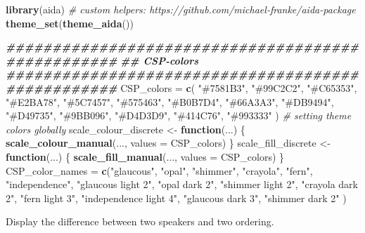 \documentclass[
]{article}
\newenvironment{Shaded}{\begin{snugshade}}{\end{snugshade}}
\newcommand{\AttributeTok}[1]{\textcolor[rgb]{0.13,0.29,0.53}{#1}}
\newcommand{\CommentTok}[1]{\textcolor[rgb]{0.56,0.35,0.01}{\textit{#1}}}
\newcommand{\ControlFlowTok}[1]{\textcolor[rgb]{0.13,0.29,0.53}{\textbf{#1}}}
\newcommand{\DocumentationTok}[1]{\textcolor[rgb]{0.56,0.35,0.01}{\textbf{\textit{#1}}}}
\newcommand{\FunctionTok}[1]{\textcolor[rgb]{0.13,0.29,0.53}{\textbf{#1}}}
\newcommand{\NormalTok}[1]{#1}
\newcommand{\OtherTok}[1]{\textcolor[rgb]{0.56,0.35,0.01}{#1}}
\newcommand{\StringTok}[1]{\textcolor[rgb]{0.31,0.60,0.02}{#1}}
\begin{document}
\begin{Shaded}
\begin{Highlighting}[]
\FunctionTok{library}\NormalTok{(aida)   }\CommentTok{\# custom helpers: https://github.com/michael{-}franke/aida{-}package}
\FunctionTok{theme\_set}\NormalTok{(}\FunctionTok{theme\_aida}\NormalTok{())}

\DocumentationTok{\#\#\#\#\#\#\#\#\#\#\#\#\#\#\#\#\#\#\#\#\#\#\#\#\#\#\#\#\#\#\#\#\#\#\#\#\#\#\#\#\#\#\#\#\#\#\#\#\#\#}
\DocumentationTok{\#\# CSP{-}colors}
\DocumentationTok{\#\#\#\#\#\#\#\#\#\#\#\#\#\#\#\#\#\#\#\#\#\#\#\#\#\#\#\#\#\#\#\#\#\#\#\#\#\#\#\#\#\#\#\#\#\#\#\#\#\#}
\NormalTok{CSP\_colors }\OtherTok{=} \FunctionTok{c}\NormalTok{(}
  \StringTok{"\#7581B3"}\NormalTok{, }\StringTok{"\#99C2C2"}\NormalTok{, }\StringTok{"\#C65353"}\NormalTok{, }\StringTok{"\#E2BA78"}\NormalTok{, }\StringTok{"\#5C7457"}\NormalTok{, }\StringTok{"\#575463"}\NormalTok{,}
  \StringTok{"\#B0B7D4"}\NormalTok{, }\StringTok{"\#66A3A3"}\NormalTok{, }\StringTok{"\#DB9494"}\NormalTok{, }\StringTok{"\#D49735"}\NormalTok{, }\StringTok{"\#9BB096"}\NormalTok{, }\StringTok{"\#D4D3D9"}\NormalTok{,}
  \StringTok{"\#414C76"}\NormalTok{, }\StringTok{"\#993333"}
\NormalTok{  )}
\CommentTok{\# setting theme colors globally}
\NormalTok{scale\_colour\_discrete }\OtherTok{\textless{}{-}} \ControlFlowTok{function}\NormalTok{(...) \{}
  \FunctionTok{scale\_colour\_manual}\NormalTok{(..., }\AttributeTok{values =}\NormalTok{ CSP\_colors)}
\NormalTok{\}}
\NormalTok{scale\_fill\_discrete }\OtherTok{\textless{}{-}} \ControlFlowTok{function}\NormalTok{(...) \{}
  \FunctionTok{scale\_fill\_manual}\NormalTok{(..., }\AttributeTok{values =}\NormalTok{ CSP\_colors)}
\NormalTok{\}}
\NormalTok{CSP\_color\_names }\OtherTok{=} \FunctionTok{c}\NormalTok{(}\StringTok{"glaucous"}\NormalTok{, }\StringTok{"opal"}\NormalTok{, }\StringTok{"shimmer"}\NormalTok{, }\StringTok{"crayola"}\NormalTok{, }\StringTok{"fern"}\NormalTok{, }\StringTok{"independence"}\NormalTok{,}
           \StringTok{"glaucous light 2"}\NormalTok{, }\StringTok{"opal dark 2"}\NormalTok{, }\StringTok{"shimmer light 2"}\NormalTok{, }\StringTok{"crayola dark 2"}\NormalTok{, }\StringTok{"fern light 3"}\NormalTok{, }\StringTok{"independence light 4"}\NormalTok{,}
           \StringTok{"glaucous dark 3"}\NormalTok{, }\StringTok{"shimmer dark 2"}
\NormalTok{           )}
\end{Highlighting}
\end{Shaded}

Display the difference between two speakers and two ordering.
\end{document}

